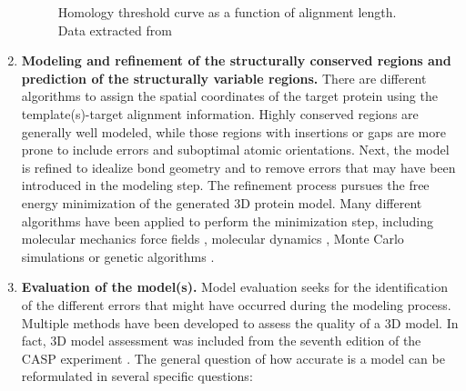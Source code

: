 \documentclass[11pt, b5paper,twoside]{tesi_upf}
\begin{document}
\begin{enumerate}
\begin{figure}[htbp]
	\caption[Homology threshold curve as a function of alignment length]{Homology threshold curve as a function of alignment length. Data extracted from \cite{Sander1991}}
	\label{fig:homology_modeling}
\end{figure}
\item \textbf{Modeling and refinement of the structurally conserved regions and prediction of the structurally variable regions.} There are different algorithms to assign the spatial coordinates of the target protein using the template(s)-target alignment information. Highly conserved regions are generally well modeled, while those regions with insertions or gaps are more prone to include errors and suboptimal atomic orientations. Next, the model is refined to idealize bond geometry and to remove errors that may have been introduced in the modeling step. The refinement process pursues the free energy minimization of the generated 3D protein model. Many different algorithms have been applied to perform the minimization step, including molecular mechanics force fields \cite{PRO1410}, molecular dynamics \cite{Fiser2000}, Monte Carlo simulations  \cite{Kidera1995} or genetic algorithms \cite{McGarrah1993}.
 
\item \textbf{Evaluation of the model(s).} Model evaluation seeks for the identification of the different errors that might have occurred during the modeling process. Multiple methods have been developed to assess the quality of a 3D model. In fact, 3D model assessment was included from the seventh edition of the CASP experiment \cite{PROT21669}. The general question of how accurate is a model can be reformulated in several specific questions: 




\end{enumerate}
\end{document}
